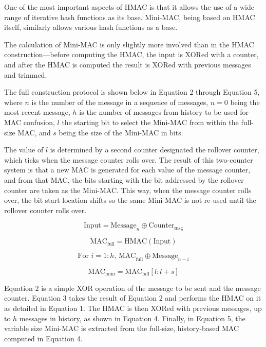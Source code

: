 One of the most important aspects of HMAC is that it allows the use of a wide range of iterative hash functions as its base. Mini-MAC, being based on HMAC itself, similarly allows various hash functions as a base.

The calculation of Mini-MAC is only slightly more involved than in the HMAC construction---before computing the HMAC, the input is XORed with a counter, and after the HMAC is computed the result is XORed with previous messages and trimmed.

The full construction protocol is shown below in Equation 2 through Equation 5, where $n$ is the number of the message in a sequence of messages, $n=0$ being the most recent message, $h$ is the number of messages from history to be used for MAC confusion, $l$ the starting bit to select the Mini-MAC from within the full-size MAC, and $s$ being the size of the Mini-MAC in bits. 

The value of $l$ is determined by a second counter designated the rollover counter, which ticks when the message counter rolls over. The result of this two-counter system is that a new MAC is generated for each value of the message counter, and from that MAC, the bits starting with the bit addressed by the rollover counter are taken as the Mini-MAC. This way, when the message counter rolls over, the bit start location shifts so the same Mini-MAC is not re-used until the rollover counter rolls over.

\begin{equation}
\text{Input} = \text{Message}_n\oplus\text{Counter}_{\text{msg}}
\end{equation}

\begin{equation}
\text{MAC}_{\text{full}} = \text{HMAC}(\text{Input})
\end{equation}

\begin{equation}
\text{For }i=1:h \text{, MAC}_{\text{full}}\oplus\text{Message}_{n-i}
\end{equation}

\begin{equation}
\text{MAC}_{\text{mini}} = \text{MAC}_{\text{full}}[l:l+s]
\end{equation}

Equation 2 is a simple XOR operation of the message to be sent and the message counter. Equation 3 takes the result of Equation 2 and performs the HMAC on it as detailed in Equation 1. The HMAC is then XORed with previous messages, up to $h$ messages in history, as shown in Equation 4. Finally, in Equation 5, the variable size Mini-MAC is extracted from the full-size, history-based MAC computed in Equation 4.

